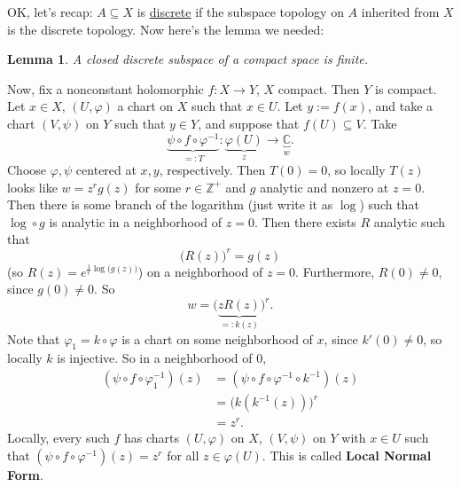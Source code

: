 \documentclass[12pt]{article}
\newcommand{\z}{\mathbb{Z}}
\newcommand{\cx}{\mathbb{C}}
\newcommand\inv[1]{#1^{-1}}
\newtheorem{lemma}[theorem]{Lemma}
\theoremstyle{definition}
\theoremstyle{remark}
\begin{document}
OK, let's recap: $A \subseteq X$ is \underline{discrete} if the subspace topology on $A$ inherited from $X$ is the discrete topology. Now here's the lemma we needed:
\begin{lemma}
    A closed discrete subspace of a compact space is finite.
\end{lemma}
Now, fix a nonconstant holomorphic $f : X \to Y$, $X$ compact. Then $Y$ is compact. Let $x \in X$, $(U , \varphi)$ a chart on $X$ such that $x \in U$. Let $y := f(x)$, and take a chart $(V , \psi)$ on $Y$ such that $y \in Y$, and suppose that $f(U) \subseteq V$. Take \begin{equation}
    \underbrace{\psi \circ f \circ \inv{\varphi}}_{=: T} : \underbrace{\varphi(U)}_{z} \to \underbrace{\cx}_{w}.
\end{equation}
Choose $\varphi, \psi$ centered at $x,y$, respectively. Then $T(0) = 0$, so locally $T(z)$ looks like $w = z^r g(z)$ for some $r \in \z^+$ and $g$ analytic and nonzero at $z = 0$. Then there is some branch of the logarithm (just write it as $\log$) such that $\log \circ g$ is analytic in a neighborhood of $z = 0$. Then there exists $R$ analytic such that 
\begin{equation}
    \big( R(z) \big)^r = g(z)
\end{equation}
(so $R(z) = e^{\frac{1}{r} \log \big( g(z) \big)}$) on a neighborhood of $z = 0$. Furthermore, $R(0) \neq 0$, since $g(0) \neq 0$. So 
\begin{equation}
    w = \big( \underbrace{z R(z)}_{=:k(z)} \big)^r.
\end{equation}
Note that $\varphi_1 = k \circ \varphi$ is a chart on some neighborhood of $x$, since $k'(0) \neq 0$, so locally $k$ is injective. So in a neighborhood of $0$,
\begin{equation}
    \begin{split}
        \left( \psi \circ f \circ \inv{\varphi_1} \right)(z) & = \left( \psi \circ f \circ \inv{\varphi} \circ \inv{k} \right)(z) \\
        & = \Big( k \left( \inv{k}(z) \right) \Big)^r \\
        & = z^r.
    \end{split}
\end{equation}
Locally, every such $f$ has charts $(U , \varphi)$ on $X$, $(V , \psi)$ on $Y$ with $x \in U$ such that $\left( \psi \circ f \circ \inv{\varphi} \right)(z) = z^r$ for all $z \in \varphi(U)$. This is called \textbf{Local Normal Form}.
\end{document}
